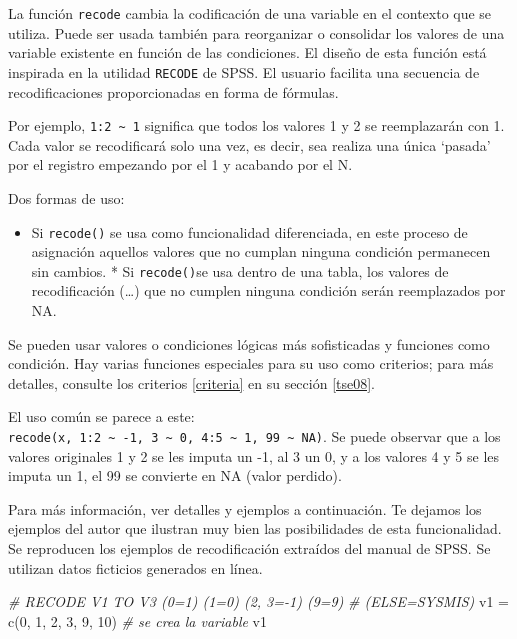 \documentclass[
]{book}
\newenvironment{Shaded}{\begin{snugshade}}{\end{snugshade}}
\newcommand{\CommentTok}[1]{\textcolor[rgb]{0.56,0.35,0.01}{\textit{#1}}}
\newcommand{\DecValTok}[1]{\textcolor[rgb]{0.00,0.00,0.81}{#1}}
\newcommand{\FunctionTok}[1]{\textcolor[rgb]{0.00,0.00,0.00}{#1}}
\newcommand{\NormalTok}[1]{#1}
\newcommand{\OtherTok}[1]{\textcolor[rgb]{0.56,0.35,0.01}{#1}}
\providecommand{\tightlist}{%
  \setlength{\itemsep}{0pt}\setlength{\parskip}{0pt}}
\begin{document}
La función \texttt{recode} cambia la codificación de una variable en el contexto que se utiliza. Puede ser usada también para reorganizar o consolidar los valores de una variable existente en función de las condiciones. El diseño de esta función está inspirada en la utilidad \texttt{RECODE} de SPSS. El usuario facilita una secuencia de recodificaciones proporcionadas en forma de fórmulas.

Por ejemplo, \texttt{1:2\ \textasciitilde{}\ 1} significa que todos los valores 1 y 2 se reemplazarán con 1. Cada valor se recodificará solo una vez, es decir, sea realiza una única `pasada' por el registro empezando por el 1 y acabando por el N.

Dos formas de uso:

\begin{itemize}
\tightlist
\item
  Si \texttt{recode()} se usa como funcionalidad diferenciada, en este proceso de asignación aquellos valores que no cumplan ninguna condición permanecen sin cambios. * Si \texttt{recode()}se usa dentro de una tabla, los valores de recodificación (\ldots) que no cumplen ninguna condición serán reemplazados por NA.
\end{itemize}

Se pueden usar valores o condiciones lógicas más sofisticadas y funciones como condición. Hay varias funciones especiales para su uso como criterios; para más detalles, consulte los criterios \ref{criteria} en su sección \ref{tse08}.

El uso común se parece a este: \texttt{recode(x,\ 1:2\ \textasciitilde{}\ -1,\ 3\ \textasciitilde{}\ 0,\ 4:5\ \textasciitilde{}\ 1,\ 99\ \textasciitilde{}\ NA)}. Se puede observar que a los valores originales 1 y 2 se les imputa un -1, al 3 un 0, y a los valores 4 y 5 se les imputa un 1, el 99 se convierte en NA (valor perdido).

Para más información, ver detalles y ejemplos a continuación. Te dejamos los ejemplos del autor que ilustran muy bien las posibilidades de esta funcionalidad. Se reproducen los ejemplos de recodificación extraídos del manual de SPSS. Se utilizan datos ficticios generados en línea.

\begin{Shaded}
\begin{Highlighting}[]
\CommentTok{\# RECODE V1 TO V3 (0=1) (1=0) (2, 3={-}1) (9=9)}
\CommentTok{\# (ELSE=SYSMIS)}
\NormalTok{v1 }\OtherTok{=} \FunctionTok{c}\NormalTok{(}\DecValTok{0}\NormalTok{, }\DecValTok{1}\NormalTok{, }\DecValTok{2}\NormalTok{, }\DecValTok{3}\NormalTok{, }\DecValTok{9}\NormalTok{, }\DecValTok{10}\NormalTok{)  }\CommentTok{\# se crea la variable}
\NormalTok{v1}
\end{Highlighting}
\end{Shaded}
\end{document}
